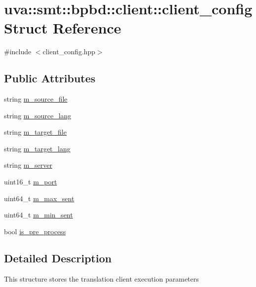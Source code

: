 \hypertarget{structuva_1_1smt_1_1bpbd_1_1client_1_1client__config}{}\section{uva\+:\+:smt\+:\+:bpbd\+:\+:client\+:\+:client\+\_\+config Struct Reference}
\label{structuva_1_1smt_1_1bpbd_1_1client_1_1client__config}


{\ttfamily \#include $<$client\+\_\+config.\+hpp$>$}

\subsection*{Public Attributes}
\begin{DoxyCompactItemize}
\item 
string \hyperlink{structuva_1_1smt_1_1bpbd_1_1client_1_1client__config_af701ff475a04b3aca0e52176608633d1}{m\+\_\+source\+\_\+file}
\item 
string \hyperlink{structuva_1_1smt_1_1bpbd_1_1client_1_1client__config_ad4305c9bb25f61695ae893d7d384b3ab}{m\+\_\+source\+\_\+lang}
\item 
string \hyperlink{structuva_1_1smt_1_1bpbd_1_1client_1_1client__config_a8080ccca0fe4582b99e3bf7b03262b66}{m\+\_\+target\+\_\+file}
\item 
string \hyperlink{structuva_1_1smt_1_1bpbd_1_1client_1_1client__config_ae891e88473325f5fced94549f79878cf}{m\+\_\+target\+\_\+lang}
\item 
string \hyperlink{structuva_1_1smt_1_1bpbd_1_1client_1_1client__config_a1659fbcf6cab9f31d2303a6eace62024}{m\+\_\+server}
\item 
uint16\+\_\+t \hyperlink{structuva_1_1smt_1_1bpbd_1_1client_1_1client__config_aca75c0d31b837ea5ae2ee1225256dd3c}{m\+\_\+port}
\item 
uint64\+\_\+t \hyperlink{structuva_1_1smt_1_1bpbd_1_1client_1_1client__config_a812b9183cff2a388fbda688616c2e9a5}{m\+\_\+max\+\_\+sent}
\item 
uint64\+\_\+t \hyperlink{structuva_1_1smt_1_1bpbd_1_1client_1_1client__config_a91950d080e1bf75c605e4c4d554c2d1d}{m\+\_\+min\+\_\+sent}
\item 
bool \hyperlink{structuva_1_1smt_1_1bpbd_1_1client_1_1client__config_ae7784ac99c68dc25baaace8b01f7afbd}{is\+\_\+pre\+\_\+process}
\end{DoxyCompactItemize}


\subsection{Detailed Description}
This structure stores the translation client execution parameters 


